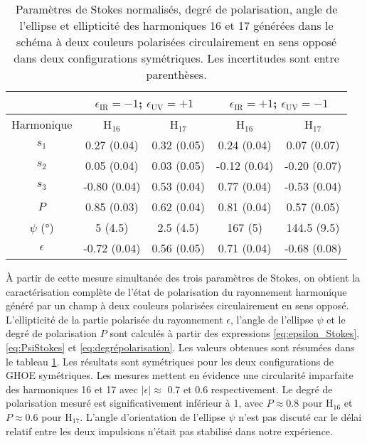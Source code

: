 \begin{table}[ht]
\centering
\begin{tabular}{|c||c|c|c|c|}
\hline
 & \multicolumn{2}{c|}{$\epsilon_{\text{IR}} = -1$; $\epsilon_{\text{UV}} = +1$} &  \multicolumn{2}{c|}{$\epsilon_{\text{IR}} = +1$; $\epsilon_{\text{UV}} = -1$} \\
\hline
Harmonique & H$_{16}$ & H$_{17}$ & H$_{16}$ & H$_{17}$ \\
\hline
$s_1$ & 0.27 (0.04) & 0.32 (0.05) & 0.24 (0.04) & 0.07 (0.07) \\
\hline
$s_2$ & 0.05 (0.04) & 0.03 (0.05) & -0.12 (0.04) & -0.20 (0.07) \\
\hline
$s_3$ & -0.80 (0.04) & 0.53 (0.04) & 0.77 (0.04) & -0.53 (0.04) \\
\hline
$P$ & 0.85 (0.03) & 0.62 (0.04) & 0.81 (0.04) & 0.57 (0.05) \\
\hline
$\psi$ (°) & 5 (4.5) & 2.5 (4.5) & 167 (5) & 144.5 (9.5) \\
\hline
$\epsilon$ & -0.72 (0.04) & 0.56 (0.05) & 0.71 (0.04) & -0.68 (0.08) \\
\hline
\end{tabular}
\caption{Paramètres de Stokes normalisés, degré de polarisation, angle de l'ellipse et ellipticité des harmoniques 16 et 17 générées dans le schéma à deux couleurs polarisées circulairement en sens opposé dans deux configurations symétriques. Les incertitudes sont entre parenthèses.}
\label{tab:resultatspm1}
\end{table}

\`{A} partir de cette mesure simultanée des trois paramètres de Stokes, on obtient la caractérisation complète de l'état de polarisation du rayonnement harmonique généré par un champ à deux couleurs polarisées circulairement en sens opposé. L'ellipticité de la partie polarisée du rayonnement $\epsilon$, l'angle de l'ellipse $\psi$ et le degré de polarisation $P$ sont calculés à partir des expressions \ref{eq:epsilon_Stokes}, \ref{eq:PsiStokes} et \ref{eq:degrépolarisation}. Les valeurs obtenues sont résumées dans le tableau \ref{tab:resultatspm1}. Les résultats sont symétriques pour les deux configurations de GHOE symétriques. Les mesures mettent en évidence une circularité imparfaite des harmoniques 16 et 17 avec $|\epsilon| \approx$ 0.7 et 0.6 respectivement. Le degré de polarisation mesuré est significativement inférieur à 1, avec $P \approx 0.8$ pour H$_{16}$ et $P \approx 0.6$ pour H$_{17}$. L'angle d'orientation de l'ellipse $\psi$ n'est pas discuté car le délai relatif entre les deux impulsions n'était pas stabilisé dans notre expérience.

